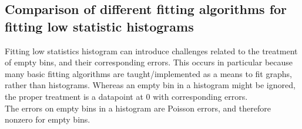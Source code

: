 \subsection{Comparison of different fitting algorithms for fitting low statistic histograms}\label{sec:App:lowStatFitting}
Fitting low statistics histogram can introduce challenges related to the treatment of empty bins, and their corresponding errors. This occurs in particular because many basic fitting algorithms are taught/implemented as a means to fit graphs, rather than histograms. Whereas an empty bin in a histogram might be ignored, the proper treatment is a datapoint at 0 with corresponding errors. \\

The errors on empty bins in a histogram are Poisson errors, and therefore nonzero for empty bins.